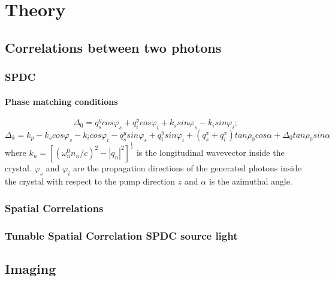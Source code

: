 
\chapter{Theory} %

\label{Chapter2} %



\section{Correlations between two photons}

\subsection{SPDC}

\cite{spatiocorrelations}

\subsubsection{Phase matching conditions}
\begin{equation}
\Delta_0 = q^y_s cos \varphi_s + q^y_i cos \varphi_i + k_s sin \varphi_s - k_i sin \varphi_i ;
\end{equation}
\begin{equation}
\Delta_k = k_p - k_s cos \varphi_s - k_i cos \varphi_i - q^y_s sin \varphi_s + q^y_i sin \varphi_i 
+ (q^x_s + q^x_i ) tan \rho_0 cos \alpha + \Delta_0 tan \rho_0 sin \alpha 
\end{equation}
where $k_n=[(\omega^0_n n_n / c )^2 - |q_n|^2]^{\frac{1}{2}}$ is the longitudinal wavevector inside the crystal. $\varphi_s$ and $\varphi_i$ are the propagation directions of the generated photons inside the crystal with respect to the pump direction $z$ and $\alpha$ is the azimuthal angle.

\subsection{Spatial Correlations}


\subsection{Tunable Spatial Correlation SPDC source light}

\section{Imaging}

